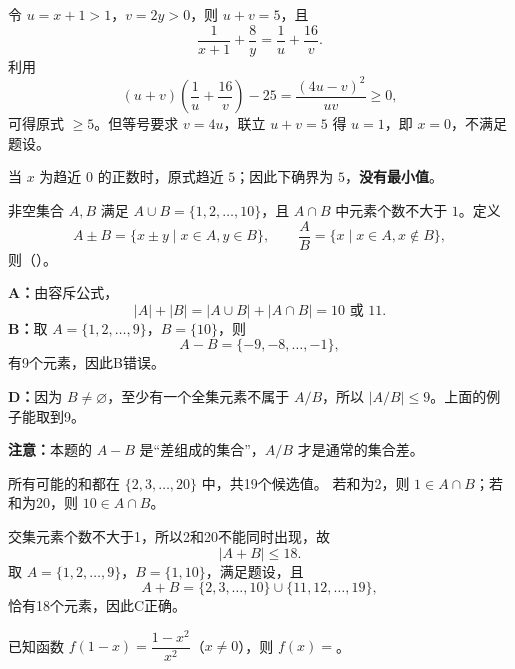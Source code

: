 \begin{frame}
令 $u=x+1>1$，$v=2y>0$，则 $u+v=5$，且
\[\frac1{x+1}+\frac8y=\frac1u+\frac{16}{v}.\]
利用
\[(u+v)\left(\frac1u+\frac{16}{v}\right)-25
=\frac{(4u-v)^2}{uv}\ge0,\]
可得原式 $\ge5$。但等号要求 $v=4u$，联立 $u+v=5$ 得 $u=1$，即 $x=0$，不满足题设。
\pause
\par\vspace{3mm}
当 $x$ 为趋近 $0$ 的正数时，原式趋近 $5$；因此下确界为 $5$，\textbf{没有最小值}。
\end{frame}

\begin{frame}
非空集合 $A,B$ 满足 $A\cup B=\{1,2,\ldots,10\}$，且 $A\cap B$ 中元素个数不大于 $1$。定义
\[A\pm B=\{x\pm y\mid x\in A,y\in B\},\qquad
\frac AB=\{x\mid x\in A,x\notin B\},\]
则（\quad）。
\pause
{}
\end{frame}

\begin{frame}
\textbf{A：}由容斥公式，
\[|A|+|B|=|A\cup B|+|A\cap B|=10\text{ 或 }11.\]
\textbf{B：}取 $A=\{1,2,\ldots,9\}$，$B=\{10\}$，则
\[A-B=\{-9,-8,\ldots,-1\},\]
有9个元素，因此B错误。
\par\vspace{2mm}
\textbf{D：}因为 $B\ne\varnothing$，至少有一个全集元素不属于 $A/B$，所以 $|A/B|\le9$。上面的例子能取到9。
\par\vspace{2mm}
\textbf{注意：}本题的 $A-B$ 是“差组成的集合”，$A/B$ 才是通常的集合差。
\end{frame}

\begin{frame}
所有可能的和都在 $\{2,3,\ldots,20\}$ 中，共19个候选值。
若和为2，则 $1\in A\cap B$；若和为20，则 $10\in A\cap B$。
\par\vspace{2mm}
交集元素个数不大于1，所以2和20不能同时出现，故
\[|A+B|\le18.\]
\pause
取 $A=\{1,2,\ldots,9\}$，$B=\{1,10\}$，满足题设，且
\[A+B=\{2,3,\ldots,10\}\cup\{11,12,\ldots,19\},\]
恰有18个元素，因此C正确。
\end{frame}

\begin{frame}
已知函数 $f(1-x)=\dfrac{1-x^2}{x^2}$（$x\ne0$），则 $f(x)=$\underline{\hspace{3cm}}。
\pause
{}
\end{frame}

